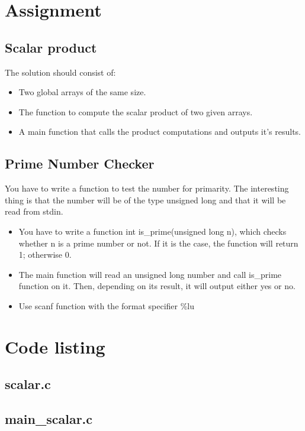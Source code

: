 \documentclass[12pt, a4paper]{article}
\begin{document}


\section*{Assignment}
\subsection*{Scalar product}
The solution should consist of:
\begin{itemize}
    \item Two global arrays of the same size.
    \item The function to compute the scalar product of two given arrays.
    \item A main function that calls the product computations and outputs it's results.
\end{itemize}

\subsection*{Prime Number Checker}
You have to write a function to test the number for primarity. The interesting thing is that the number will be 
of the type unsigned long and that it will be read from stdin.
\begin{itemize}
    \item You have to write a function int is\_prime(unsigned long n), which checks whether n is a prime number or not. If it is the case, the function will return 1; otherwise 0.
    \item The main function will read an unsigned long number and call is\_prime function on it. Then, depending on its result, it will output either yes or no.
    \item Use scanf function with the format specifier \%lu
\end{itemize}

\section*{Code listing}
\subsection*{scalar.c}


\subsection*{main\_scalar.c}

\end{document}

